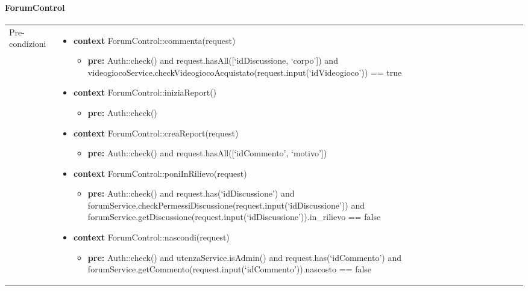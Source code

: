 \paragraph{ForumControl}
\small\begin{tabular}{|| l | p{28em} ||} 
\hline
Pre-condizioni & \begin{itemize}[leftmargin=*]
	\item \textbf{context} ForumControl::commenta(request)
	\begin{itemize}
		\item[ ] \textbf{pre:} Auth::check()
		and request.hasAll([‘idDiscussione, ‘corpo’])
		and videogiocoService.checkVideogiocoAcquistato(request.\newline input(‘idVideogioco’)) == true	
	\end{itemize}

	\item \textbf{context} ForumControl::iniziaReport()
	\begin{itemize}
		\item[ ] \textbf{pre:} Auth::check()	
	\end{itemize}

	\item \textbf{context} ForumControl::creaReport(request)
	\begin{itemize}
		\item[ ] \textbf{pre:} Auth::check()
		and request.hasAll([‘idCommento’, ‘motivo’])	
	\end{itemize}

	\item \textbf{context} ForumControl::poniInRilievo(request)
	\begin{itemize}
		\item[ ] \textbf{pre:} Auth::check() and request.has(‘idDiscussione’) and forumService\newline .checkPermessiDiscussione(request.input(‘idDiscussione’)) and forumService\newline .getDiscussione(request.input(‘idDiscussione’)).in\_rilievo == false
	\end{itemize}

	\item \textbf{context} ForumControl::nascondi(request)
	\begin{itemize}
		\item[ ] \textbf{pre:} Auth::check() and utenzaService.isAdmin() and request.has(‘idCommento’) and forumService.getCommento(request.input(‘idCommento’)).nascosto == false
	\end{itemize}


\end{itemize}
\end{tabular}
